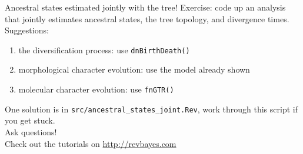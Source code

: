 \documentclass[mathserif]{beamer}
\begin{document}
\begin{frame}[fragile]
    \begin{block}{Ancestral states estimated jointly with the tree!}
    \bigskip
        \small
        \alert{Exercise:} code up an analysis that jointly estimates
        ancestral states, the tree topology, and divergence times.\\
    \bigskip
        Suggestions:
        \begin{enumerate}
            \item the diversification process: use \texttt{dnBirthDeath()}
            \item morphological character evolution: use the model already shown
            \item molecular character evolution: use \texttt{fnGTR()}
        \end{enumerate}
    \bigskip
        One solution is in \texttt{src/ancestral\_states\_joint.Rev},
        work through this script if you get stuck.\\
    \bigskip
        Ask questions!\\
    \bigskip
        Check out the tutorials on \url{http://revbayes.com}\\
    \end{block}
\end{frame}
\end{document}
